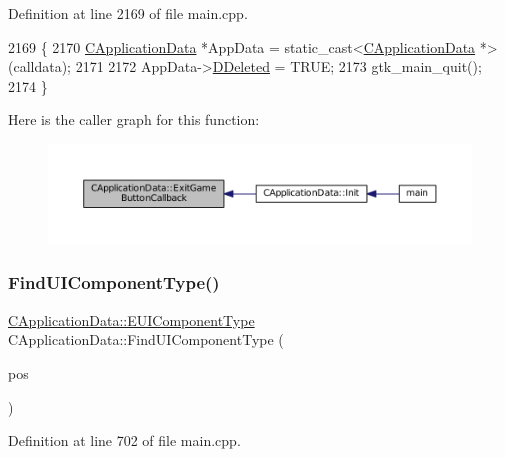 Definition at line 2169 of file main.\+cpp.


\begin{DoxyCode}
2169                                                            \{
2170     \hyperlink{classCApplicationData}{CApplicationData} *AppData = \textcolor{keyword}{static\_cast<}\hyperlink{classCApplicationData}{CApplicationData} *\textcolor{keyword}{>}(calldata);
2171     
2172     AppData->\hyperlink{classCApplicationData_a0a8651f95f3d48befd6e02a286ecdc82}{DDeleted} = TRUE;
2173     gtk\_main\_quit();
2174 \}
\end{DoxyCode}
Here is the caller graph for this function\+:\nopagebreak
\begin{figure}[H]
\begin{center}
\leavevmode
\includegraphics[width=350pt]{classCApplicationData_a6a2c934fee258ccdb2a4a70c075f79fd_icgraph}
\end{center}
\end{figure}
\hypertarget{classCApplicationData_a1fb2747750babd9b82f51ce206ee6755}{}\label{classCApplicationData_a1fb2747750babd9b82f51ce206ee6755} 
\subsubsection{\texorpdfstring{Find\+U\+I\+Component\+Type()}{FindUIComponentType()}}
{\footnotesize\ttfamily \hyperlink{classCApplicationData_ad49585591fc53bff1c89bc512170280d}{C\+Application\+Data\+::\+E\+U\+I\+Component\+Type} C\+Application\+Data\+::\+Find\+U\+I\+Component\+Type (\begin{DoxyParamCaption}\item[{const \hyperlink{classCPosition}{C\+Position} \&}]{pos }\end{DoxyParamCaption})\hspace{0.3cm}{\ttfamily [protected]}}



Definition at line 702 of file main.\+cpp.


